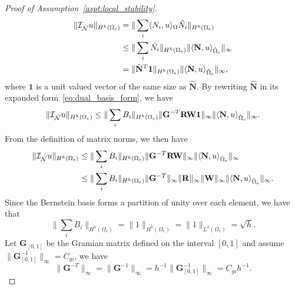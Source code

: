 \begin{proof}[Proof of Assumption~\ref{aspt:local_stability}]
	\begin{align}
		\begin{split}
			\| \mathcal{I}_{\hat{\mathcal{N}}}u \|_{H^k(\Omega_e)} &= \| \sum_i \langle {N_i,u} \rangle_{\Omega}\hat{N}_i \|_{H^k(\Omega_e)}\\
			&\leq \| \sum_i \hat{N}_i\|_{H^k(\Omega_e)} \| \langle {\mathbf{N},u} \rangle_{\hat{\Omega}_e} \|_\infty\\
			&= \| \hat{\mathbf{N}}^T\mathbf{1} \|_{H^k(\Omega_e)} \| \langle {\mathbf{N},u} \rangle_{\hat{\Omega}_e} \|_\infty,
		\end{split}
	\end{align}
	where $\mathbf{1}$ is a unit valued vector of the same size as $\hat{\mathbf{N}}$. By rewriting $\hat{\mathbf{N}}$ in its expanded form~\eqref{eq:dual_basis_form}, we have
	\begin{equation}
		\| \mathcal{I}_{\hat{\mathcal{N}}}u \|_{H^k(\Omega_e)} \leq  \| \sum_i{B_i} \|_{H^k(\Omega_e)} \| \mathbf{G}^{-T}\mathbf{R}\mathbf{W}\mathbf{1} \|_\infty \| \langle {\mathbf{N},u} \rangle_{\hat{\Omega}_e} \|_\infty.
	\end{equation}
	From the definition of matrix norms, we then have
	\begin{equation}
		\begin{split}
			\| \mathcal{I}_{\hat{\mathcal{N}}}u \|_{H^k(\Omega_e)} &\leq \| \sum_i{B_i} \|_{H^k(\Omega_e)} \| \mathbf{G}^{-T}\mathbf{R}\mathbf{W}\|_\infty \| \langle {\mathbf{N},u} \rangle_{\hat{\Omega}_e} \|_\infty\\
			&\leq \| \sum_i{B_i} \|_{H^k(\Omega_e)} \| \mathbf{G}^{-T} \|_\infty \| \mathbf{R} \|_\infty \| \mathbf{W} \|_\infty \| \langle {\mathbf{N},u} \rangle_{\hat{\Omega}_e} \|_\infty.
		\end{split}\label{eq:proof_of_assumption3_1}
	\end{equation}
	Since the Bernstein basis forms a partition of unity over each element, we have that
	\begin{equation}
		\| \sum_i{B_i} \|_{H^k(\Omega_e)} = \| 1 \|_{H^k(\Omega_e)} = \| 1 \|_{L^2(\Omega_e)} = \sqrt{h}.\label{eq:proof_of_assumption3_2}
	\end{equation}
	Let $\mathbf{G}_{\left[ 0,1 \right]}$ be the Gramian matrix defined on the interval $\left[ 0,1 \right]$ and assume $\|\mathbf{G}^{-1}_{\left[ 0,1 \right]}\|_\infty = C_{gi}$, we have
	\begin{equation}
		\| \mathbf{G}^{-T} \|_\infty = \| \mathbf{G}^{-1} \|_\infty = h^{-1} \|\mathbf{G}^{-1}_{\left[ 0,1 \right]}\|_\infty = C_{gi}h^{-1}.\label{eq:proof_of_assumption3_3}
	\end{equation}


\end{proof}
